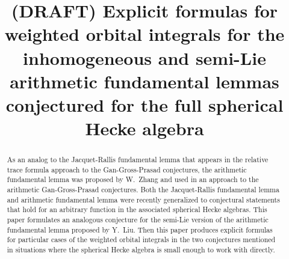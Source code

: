 \documentclass[twoside]{mitthesis}
\begin{document}
\title{(DRAFT) Explicit formulas for weighted orbital integrals for the
  inhomogeneous and semi-Lie arithmetic fundamental lemmas
  conjectured for the full spherical Hecke algebra}



\maketitle

\begin{abstract}
  As an analog to the Jacquet-Rallis fundamental lemma that appears in the
  relative trace formula approach to the Gan-Gross-Prasad conjectures,
  the arithmetic fundamental lemma was proposed by W.\ Zhang and used in an approach
  to the arithmetic Gan-Gross-Prasad conjectures.
  Both the Jacquet-Rallis fundamental lemma and arithmetic fundamental lemma
  were recently generalized to conjectural statements that hold
  for an arbitrary function in the associated spherical Hecke algebras.
  This paper formulates an analogous conjecture for the semi-Lie version
  of the arithmetic fundamental lemma proposed by Y.\ Liu.
  Then this paper produces explicit formulas for particular cases
  of the weighted orbital integrals in the two conjectures mentioned
  in situations where the spherical Hecke algebra is small enough to work with directly.
\end{abstract}

\onehalfspacing %



\tableofcontents
\listoffigures
\listoftables


















\printbibliography[title=References,heading=bibintoc]

\appendix
\end{document}
